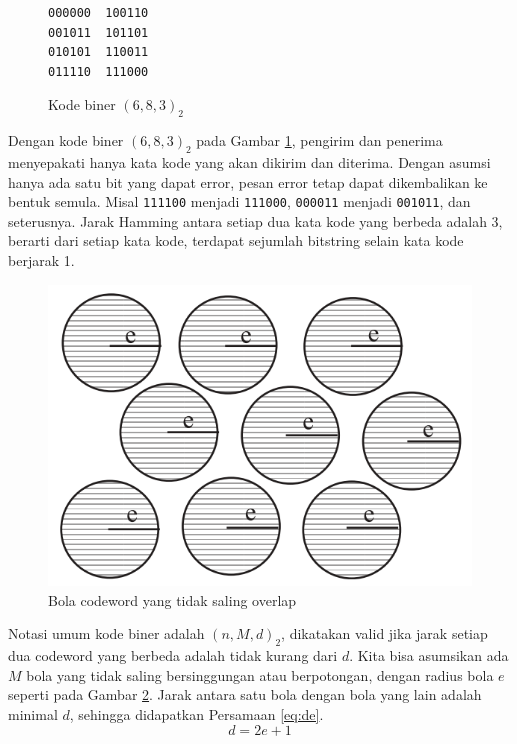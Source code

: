 \begin{figure}
\centering
\begin{BVerbatim}
000000  100110
001011  101101
010101  110011
011110  111000
\end{BVerbatim}
\caption{Kode biner $(6,8,3)_2$}
\label{fig:binarycode683}
\end{figure}

Dengan kode biner $(6,8,3)_2$ pada Gambar \ref{fig:binarycode683}, pengirim dan penerima menyepakati hanya kata kode yang akan dikirim dan diterima. Dengan asumsi hanya ada satu bit yang dapat error, pesan error tetap dapat dikembalikan ke bentuk semula. Misal \texttt{111100} menjadi \texttt{111000}, \texttt{000011} menjadi \texttt{001011}, dan seterusnya. Jarak Hamming antara setiap dua kata kode yang berbeda adalah 3, berarti dari setiap kata kode, terdapat sejumlah bitstring selain kata kode berjarak 1.

\begin{figure}
\centering
\includegraphics[scale=0.6]{../img/codewordsball.png}
\caption{Bola codeword yang tidak saling overlap}
\label{fig:codewordsball}
\end{figure}

Notasi umum kode biner adalah $(n,M,d)_2$, dikatakan valid jika jarak setiap dua codeword yang berbeda adalah tidak kurang dari $d$. Kita bisa asumsikan ada $M$ bola yang tidak saling bersinggungan atau berpotongan, dengan radius bola $e$ seperti pada Gambar \ref{fig:codewordsball}. Jarak antara satu bola dengan bola yang lain adalah minimal $d$, sehingga didapatkan Persamaan \ref{eq:de}.
\begin{equation} \label{eq:de}
d = 2e + 1
\end{equation}

